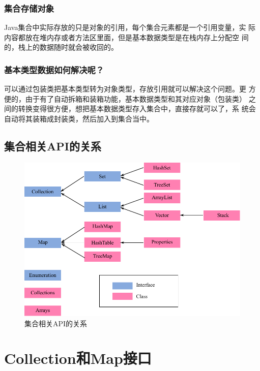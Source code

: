 \subsubsection{集合存储对象}

Java集合中实际存放的只是对象的引用，每个集合元素都是一个引用变量，实
际内容都放在堆内存或者方法区里面，但是基本数据类型是在栈内存上分配空
间的，栈上的数据随时就会被收回的。

\subsubsection{基本类型数据如何解决呢？}

可以通过包装类把基本类型转为对象类型，存放引用就可以解决这个问题。更
方便的，由于有了自动拆箱和装箱功能，基本数据类型和其对应对象（包装类）
之间的转换变得很方便，想把基本数据类型存入集合中，直接存就可以了，系
统会自动将其装箱成封装类，然后加入到集合当中。

\subsection{集合相关API的关系}

\begin{figure}[htb]
\centering
\includegraphics[width=\textwidth]{images/Set-list-map/fig-set-list-map.pdf}
\caption{集合相关API的关系}
\label{fig:set-map-list}
\end{figure}

\section{Collection和Map接口}

